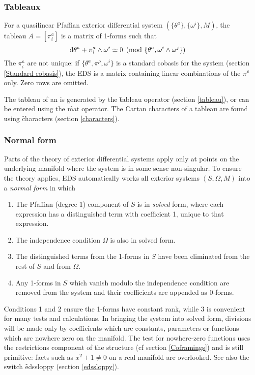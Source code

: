 \subsubsection{Tableaux}
\label{Tableaux}

For a quasilinear Pfaffian exterior differential system
$(\{\theta^a\},\{\omega^i\},M)$, the tableau $A=[\pi^a_i]$
is a matrix of 1-forms such that
$$	\mathrm{d} \theta^a + \pi^a_i\wedge\omega^i \simeq 0 
		\pmod{\{\theta^a,\omega^i\wedge\omega^j\}}
$$
The $\pi^a_i$ are not unique: if $\{\theta^a,\pi^\rho,\omega^i\}$ is a
standard cobasis for the system (section \ref{Standard cobasis}), the EDS
 is a matrix containing linear combinations of the $\pi^\rho$
only. Zero rows are omitted.

The tableau of an  is generated by the \f{tableau} operator
(section \ref{tableau}), or can be entered using the \f{mat} operator. The
Cartan characters of a tableau are found using \f{characters} (section
\ref{characters}).

\subsubsection{Normal form}
\label{Normal form}

Parts of the theory of exterior differential systems apply only at points
on the underlying manifold where the system is in some sense
non-singular. To ensure the theory applies, EDS automatically works all
exterior systems $(S,\Omega,M)$ into a {\em normal form} in which

\begin{enumerate}
\item The Pfaffian (degree 1) component of $S$ is in {\em solved} form,
      where each expression has a distinguished term with coefficient 1,
      unique to that expression.
\item The independence condition $\Omega$ is also in solved form.
\item The distinguished terms from the 1-forms in $S$ have been eliminated
      from the rest of $S$ and from $\Omega$.
\item Any 1-forms in $S$ which vanish modulo the independence condition are
      removed from the system and their coefficients are appended as
      0-forms.
\end{enumerate}

Conditions 1 and 2 ensure the 1-forms have constant rank, while 3 is
convenient for many tests and calculations. In bringing the system into
solved form, divisions will be made only by coefficients which are
constants, parameters or functions which are nowhere zero on the
manifold. The test for nowhere-zero functions uses the restrictions
component of the  structure (cf section \ref{Coframings}) and
is still primitive: facts such as $x^2+1\neq0$ on a real manifold are
overlooked. See also the switch \f{edssloppy} (section \ref{edssloppy}).

